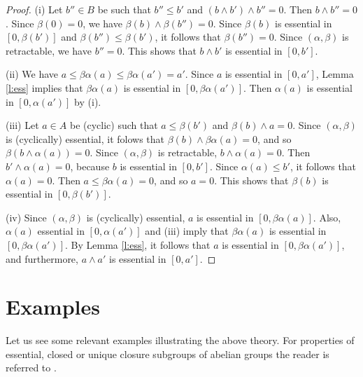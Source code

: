 \documentclass[11pt,a4paper]{amsart}
\begin{document}
\begin{proof} (i) Let $b''\in B$ be such that $b''\leq b'$ and $(b\wedge b')\wedge b''=0$. Then $b\wedge b''=0$. Since
$\beta(0)=0$, we have $\beta(b)\wedge \beta(b'')=0$. Since $\beta(b)$ is essential in $[0,\beta(b')]$ and
$\beta(b'')\leq \beta(b')$, it follows that $\beta(b'')=0$. Since $(\alpha,\beta)$ is retractable, we have $b''=0$.
This shows that $b\wedge b'$ is essential in $[0,b']$. 

(ii) We have $a\leq \beta\alpha(a)\leq \beta\alpha(a')=a'$. Since $a$ is essential in $[0,a']$, Lemma \ref{l:ess}
implies that $\beta\alpha(a)$ is essential in $[0,\beta\alpha(a')]$. Then $\alpha(a)$ is essential in $[0,\alpha(a')]$
by (i).

(iii) Let $a\in A$ be (cyclic) such that $a\leq \beta(b')$ and $\beta(b)\wedge a=0$. Since $(\alpha,\beta)$ is
(cyclically) essential, it folows that $\beta(b)\wedge \beta\alpha(a)=0$, and so $\beta(b\wedge \alpha(a))=0$. Since
$(\alpha,\beta)$ is retractable, $b\wedge \alpha(a)=0$. Then $b'\wedge \alpha(a)=0$, because $b$ is essential in
$[0,b']$. Since $\alpha(a)\leq b'$, it follows that $\alpha(a)=0$. Then $a\leq \beta\alpha(a)=0$, and
so $a=0$. This shows that $\beta(b)$ is essential in $[0,\beta(b')]$.

(iv) Since $(\alpha,\beta)$ is (cyclically) essential, $a$ is essential in $[0,\beta\alpha(a)]$. Also, $\alpha(a)$
essential in $[0,\alpha(a')]$ and (iii) imply that $\beta\alpha(a)$ is essential in $[0,\beta\alpha(a')]$. By Lemma
\ref{l:ess}, it follows that $a$ is essential in $[0,\beta\alpha(a')]$, and furthermore, $a\wedge a'$ is essential in
$[0,a']$.
\end{proof}

\section{Examples}

Let us see some relevant examples illustrating the above theory. For properties of essential, closed or unique closure
subgroups of abelian groups the reader is referred to \cite{CO,CS}.
\end{document}
